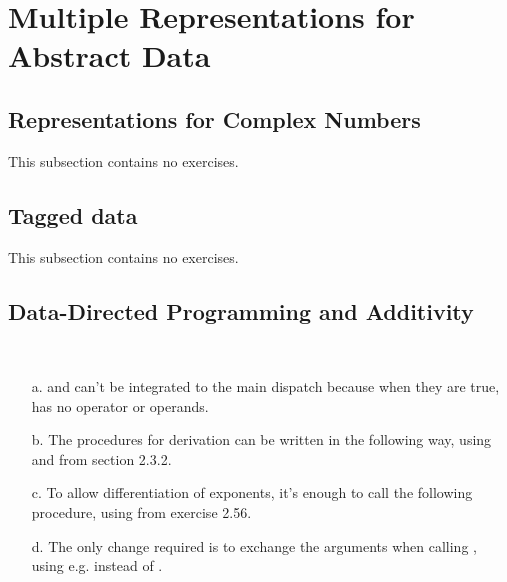 \section{Multiple Representations for Abstract Data}

\subsection{Representations for Complex Numbers}

This subsection contains no exercises.

\subsection{Tagged data}

This subsection contains no exercises.

\subsection{Data-Directed Programming and Additivity}

\begin{exe}[2.73]
    \ \vspace{-20pt}
    \begin{itemize}
        \item[a.]  and  can’t be integrated 
            to the main dispatch because when they are true,  has no 
            operator or operands.

        \item[b.] The procedures for derivation can be written in the following 
            way, using  and  from section 
            2.3.2.

        \item[c.] To allow differentiation of exponents, it’s enough to call the 
            following procedure, using  from exercise 
            2.56.

        \item[d.] The only change required is to exchange the arguments when 
            calling , using e.g.  
            instead of .
    \end{itemize}
\end{exe}

